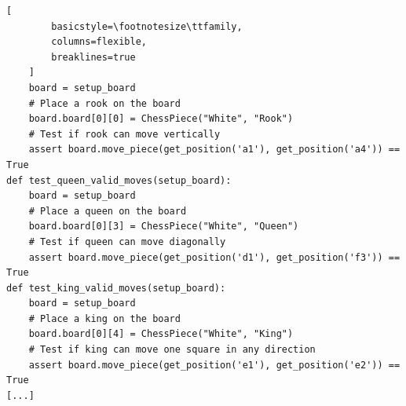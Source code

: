 \begin{itemize}
\begin{lstlisting}[
        basicstyle=\footnotesize\ttfamily,
        columns=flexible,
        breaklines=true
    ]
    board = setup_board
    # Place a rook on the board
    board.board[0][0] = ChessPiece("White", "Rook")
    # Test if rook can move vertically
    assert board.move_piece(get_position('a1'), get_position('a4')) == True
def test_queen_valid_moves(setup_board):
    board = setup_board
    # Place a queen on the board
    board.board[0][3] = ChessPiece("White", "Queen")
    # Test if queen can move diagonally
    assert board.move_piece(get_position('d1'), get_position('f3')) == True
def test_king_valid_moves(setup_board):
    board = setup_board
    # Place a king on the board
    board.board[0][4] = ChessPiece("White", "King")
    # Test if king can move one square in any direction
    assert board.move_piece(get_position('e1'), get_position('e2')) == True
[...]
    \end{lstlisting}
\end{itemize}



